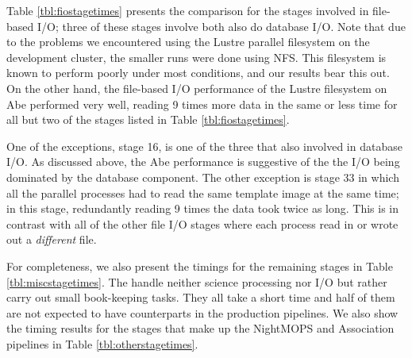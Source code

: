 Table \ref{tbl:fiostagetimes} presents the comparison
for the stages involved in file-based I/O; three of these stages
involve both also do database I/O.  Note that due to the problems we
encountered using the Lustre parallel filesystem on the development
cluster, the smaller runs were done using NFS.  This filesystem is
known to perform poorly under most conditions, and our results bear
this out.  On the other hand, the file-based I/O performance of the
Lustre filesystem on Abe performed very well, reading 9 times more
data in the same or less time for all but two of the stages listed in
Table \ref{tbl:fiostagetimes}.  

One of the exceptions, stage 16, is one of the three that also
involved in database I/O.  As discussed above, the Abe performance
is suggestive of the the I/O being dominated by the database
component.  The other exception is stage 33 in which all the parallel
processes had to read the same template image at the same time; in
this stage, redundantly reading 9 times the data took twice as long.
This is in contrast with all of the other file I/O stages where each
process read in or wrote out a \textit{different} file.  

For completeness, we also present the timings for the remaining
stages in Table \ref{tbl:miscstagetimes}.  The handle neither science
processing nor I/O but rather carry out small book-keeping tasks.
They all take a short time and half of them are not expected to have
counterparts in the production pipelines.   We also show the timing
results for the stages that make up the NightMOPS and Association
pipelines in Table \ref{tbl:otherstagetimes}.  

